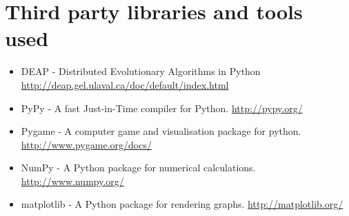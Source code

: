 \documentclass[a4paper,11pt]{kth-mag}
\begin{document}
\chapter{Third party libraries and tools used}
\label{list-of-third-party-tools}
\begin{itemize}
\item DEAP - Distributed Evolutionary Algorithms in Python \url{http://deap.gel.ulaval.ca/doc/default/index.html}
\item PyPy - A fast Just-in-Time compiler for Python. \url{http://pypy.org/}
\item Pygame - A computer game and visualisation package for python. \url{http://www.pygame.org/docs/}
\item NumPy - A Python package for numerical calculations. \url{http://www.numpy.org/}
\item matplotlib - A Python package for rendering graphs. \url{http://matplotlib.org/}
\end{itemize}
\end{document}
